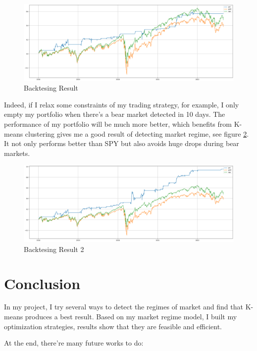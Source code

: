 \documentclass[a4paper,12pt]{article}
\begin{document}
\begin{figure}[H]
    \centering
    \includegraphics[scale=0.3]{backtest1.png}
    \caption{Backtesing Result}\label{backtest1}
\end{figure}

Indeed, if I relax some constraints of my trading strategy, for example, I only empty my portfolio when there's a bear market detected in 10 days. The performance of my portfolio will be much more better, which benefits from K-means clustering gives me a good result of detecting market regime, see figure \ref{backtest2}. It not only performs better than SPY but also avoids huge drops during bear markets.

\begin{figure}[H]
    \centering
    \includegraphics[scale=0.3]{backtest2.png}
    \caption{Backtesing Result 2}\label{backtest2}
\end{figure}

\section{Conclusion}

In my project, I try several ways to detect the regimes of market and find that K-means produces a best result. Based on my market regime model, I built my optimization strategies, results show that they are feasible and efficient.

At the end, there're many future works to do:
\end{document}
